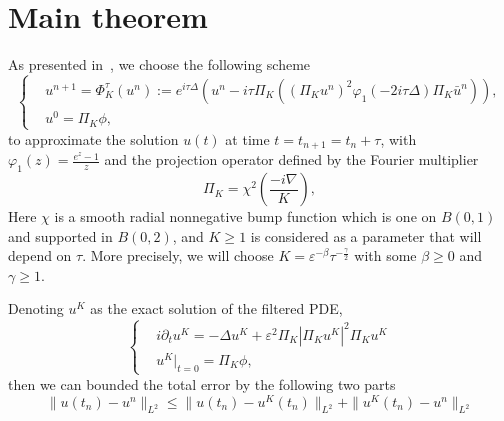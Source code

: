 \documentclass[10pt,a4paper]{article}
\begin{document}
  \section{Main theorem}
  As presented in~\cite{ORS21}, we choose the following scheme
  \begin{equation}\label{num-sol} %
    \left\{
    \begin{aligned}
      & u^{n+1} = \Phi_K^{\tau}(u^n) := e^{i\tau\Delta} \left( u^n - i\tau\Pi_K
      \left( {(\Pi_K u^n)}^2 \varphi_1(-2i\tau\Delta)\Pi_K \bar{u}^n \right) \right), \\
      & u^0 = \Pi_K \phi,
    \end{aligned}
    \right.
  \end{equation}
  to approximate the solution \(u(t)\) at time \( t = t_{n+1} = t_n + \tau \),
  with \( \varphi_1(z) = \frac{e^z-1}{z} \) and the projection operator defined
  by the Fourier multiplier
  \begin{equation}
    \Pi_K = \chi^2 \left( \frac{-i\nabla}{K} \right),
  \end{equation}
  Here \(\chi\) is a smooth radial nonnegative bump function which is one on \(
  B(0,1) \) and supported in \( B(0,2) \), and \( K \geq 1 \) is considered as a
  parameter that will depend on \(\tau\). More precisely, we will choose \( K =
  \varepsilon^{-\beta}\tau^{-\frac\gamma2} \) with some \(\beta \geq 0\) and 
  \(\gamma \geq 1\).  

  Denoting \(u^K\) as the exact solution of the filtered PDE,
  \begin{equation}\label{nls-fil} %
    \left\{
    \begin{aligned}
      & i\partial_t u^K = -\Delta u^K + \varepsilon^2 \Pi_K|\Pi_K u^K|^2 \Pi_K u^K \\
      & u^K|_{t=0} = \Pi_K\phi,
    \end{aligned}
    \right.
  \end{equation}
  then we can bounded the total error by the following two parts
  \begin{equation}%
    \| u(t_n) - u^n \|_{L^2} \leq \| u(t_n) - u^K(t_n) \|_{L^2} + 
    \| u^K(t_n) - u^n \|_{L^2}
  \end{equation}
  
\end{document}
